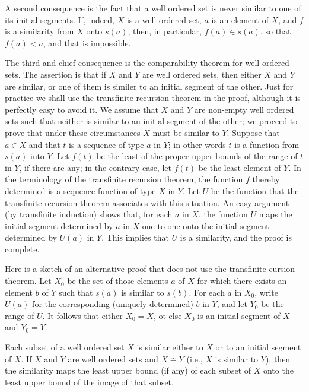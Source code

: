 A second consequence is the fact that a well ordered set is never similar to one of its initial segments. If, indeed, $X$ is a well ordered set, $a$ is an element of $X$, and $f$ is a similarity from $X$ onto $s(a)$, then, in particular, $f(a) \in s(a)$, so that $f(a) < a$, and that is impossible. 

The third and chief consequence is the comparability theorem for well ordered sets. The assertion is that if $X$ and $Y$ are well ordered sets, then either $X$ and $Y$ are similar, or one of them is similer to an initial segment of the other. Just for practice we shall use the transfinite recursion theorem in the proof, although it is perfectly easy to avoid it. We assume that $X$ and $Y$ are non-empty well ordered sets such that neither is similar to an initial segment of the other; we proceed to prove that under these circumstances $X$ must be similar to $Y$. Suppose that $a \in X$ and that $t$ is a sequence of type $a$ in $Y$; in other words $t$ is a function from $s(a)$ into $Y$. Let $f(t)$ be the least of the proper upper bounds of the range of $t$ in $Y$, if there are any; in the contrary case, let $f(t)$ be the least element of $Y$. In the terminology of the transfinite recursion theorem, the function $f$ thereby determined is a sequence function of type $X$ in $Y$. Let $U$ be the function that the transfinite recursion theorem associates with this situation. An easy argument (by transfinite induction) shows that, for each $a$ in $X$, the function $U$ maps the initial segment determined by $a$ in $X$ one-to-one onto the initial segment determined by $U(a)$ in $Y$. This implies that $U$ is a similarity, and the proof is complete. 

Here is a sketch of an alternative proof that does not use the transfinite cursion theorem. Let $X_{0}$ be the set of those elements $a$ of $X$ for which there exists an element $b$ of $Y$ such that $s(a)$ is similar to $s(b)$. For each $a$ in $X_{0}$, write $U(a)$ for the corresponding (uniquely determined) $b$ in $Y$, and let $Y_{0}$ be the range of $U$. It follows that either $X_{0} = X$, ot else $X_{0}$ is an initial segment of $X$ and $Y_{0} = Y$. 

\begin{exercise} Each subset of a well ordered set $X$ is similar either to $X$ or to an initial segment of $X$. If $X$ and $Y$ are well ordered sets and $X \cong Y$ (i.e., $X$ is similar to $Y$), then the similarity maps the least upper bound (if any) of each subset of $X$ onto the least upper bound of the image of that subset.
\end{exercise}
